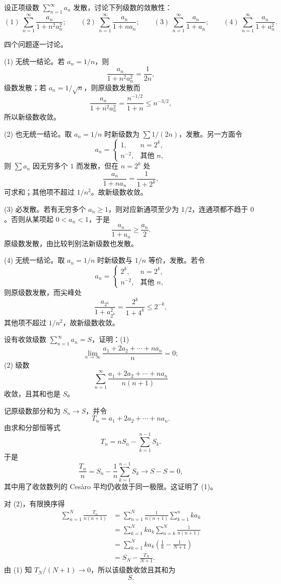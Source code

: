 \begin{xreferenceproblem}[18]
设正项级数 $\sum_{n=1}^{\infty}a_n$ 发散，讨论下列级数的敛散性：
\[
(1)\ \sum_{n=1}^{\infty}\frac{a_n}{1+n^2a_n^2};\qquad
(2)\ \sum_{n=1}^{\infty}\frac{a_n}{1+na_n};\qquad
(3)\ \sum_{n=1}^{\infty}\frac{a_n}{1+a_n};\qquad
(4)\ \sum_{n=1}^{\infty}\frac{a_n}{1+a_n^2}.
\]
\end{xreferenceproblem}
\begin{xsolution}
四个问题逐一讨论。

(1) 无统一结论。若 $a_n=1/n$，则
\[
 \frac{a_n}{1+n^2a_n^2}=\frac1{2n},
\]
级数发散；若 $a_n=1/\sqrt n$，则原级数发散而
\[
 \frac{a_n}{1+n^2a_n^2}
 =\frac{n^{-1/2}}{1+n}\leq n^{-3/2},
\]
所以新级数收敛。

(2) 也无统一结论。取 $a_n=1/n$ 时新级数为 $\sum1/(2n)$，发散。另一方面令
\[
 a_n=\begin{cases}
 1,&n=2^k,\\
 n^{-2},&\text{其他 }n,
 \end{cases}
\]
则 $\sum a_n$ 因无穷多个 $1$ 而发散，但在 $n=2^k$ 处
\[
 \frac{a_n}{1+na_n}=\frac1{1+2^k},
\]
可求和；其他项不超过 $1/n^2$。故新级数收敛。

(3) 必发散。若有无穷多个 $a_n\geq1$，则对应新通项至少为 $1/2$，连通项都不趋于 $0$。否则从某项起 $0<a_n<1$，于是
\[
 \frac{a_n}{1+a_n}\geq\frac{a_n}{2}.
\]
原级数发散，由比较判别法新级数也发散。

(4) 无统一结论。取 $a_n=1/n$ 时新级数与 $1/n$ 等价，发散。若令
\[
 a_n=\begin{cases}
 2^k,&n=2^k,\\
 n^{-2},&\text{其他 }n,
 \end{cases}
\]
则原级数发散，而尖峰处
\[
 \frac{a_{2^k}}{1+a_{2^k}^2}
 =\frac{2^k}{1+4^k}\leq2^{-k},
\]
其他项不超过 $1/n^2$，故新级数收敛。
\end{xsolution}


\begin{xreferenceproblem}[19]
设有收敛级数 $\sum_{n=1}^{\infty}a_n=S$，证明：(1)
\[
\lim_{n\to\infty}\frac{a_1+2a_2+\cdots+na_n}{n}=0;
\]
(2) 级数
\[
\sum_{n=1}^{\infty}\frac{a_1+2a_2+\cdots+na_n}{n(n+1)}
\]
收敛，且其和也是 $S$。
\end{xreferenceproblem}
\begin{xsolution}
记原级数部分和为 $S_n\to S$，并令
\[
 T_n=a_1+2a_2+\cdots+na_n.
\]
由求和分部恒等式
\[
 T_n=nS_n-\sum_{k=1}^{n-1}S_k.
\]
于是
\[
 \frac{T_n}{n}
 =S_n-\frac1n\sum_{k=1}^{n-1}S_k\longrightarrow S-S=0,
\]
其中用了收敛数列的 Cesàro 平均仍收敛于同一极限。这证明了 (1)。

对 (2)，有限换序得
\[
 \begin{aligned}
 \sum_{n=1}^{N}\frac{T_n}{n(n+1)}
 &=\sum_{n=1}^{N}\frac1{n(n+1)}\sum_{k=1}^{n}ka_k\\
 &=\sum_{k=1}^{N}ka_k\sum_{n=k}^{N}\frac1{n(n+1)}\\
 &=\sum_{k=1}^{N}ka_k\left(\frac1k-\frac1{N+1}\right)\\
 &=S_N-\frac{T_N}{N+1}.
\end{aligned}
\]
由 (1) 知 $T_N/(N+1)\to0$，所以该级数收敛且其和为
\[
 \boxed{S}.
\]
\end{xsolution}


